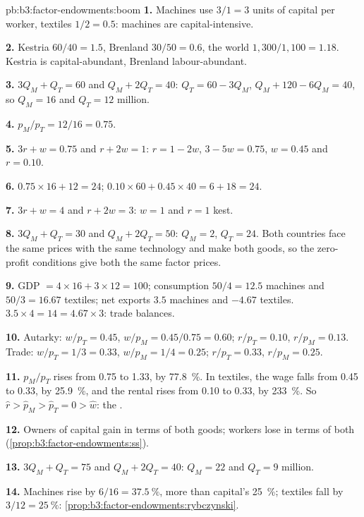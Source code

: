\begin{solution}{pb:b3:factor-endowments:boom}
\textbf{1.} Machines use $3/1 = 3$ units of capital per worker, textiles $1/2 = 0.5$:
machines are capital-intensive. %

\textbf{2.} Kestria $60/40 = 1.5$, Brenland $30/50 = 0.6$, the world $1{,}300/1{,}100 = 1.18$.
Kestria is capital-abundant, Brenland labour-abundant.

\textbf{3.} $3Q_M + Q_T = 60$ and $Q_M + 2Q_T = 40$: $Q_T = 60 - 3Q_M$, $Q_M + 120 - 6Q_M = 40$, so
$Q_M = 16$ and $Q_T = 12$ million. %

\textbf{4.} $p_M/p_T = 12/16 = 0.75$.

\textbf{5.} $3r + w = 0.75$ and $r + 2w = 1$: $r = 1 - 2w$, $3 - 5w = 0.75$, $w = 0.45$ and $r =
0.10$.

\textbf{6.} $0.75 \times 16 + 12 = 24$; $0.10 \times 60 + 0.45 \times 40 = 6 + 18 = 24$.

\textbf{7.} $3r + w = 4$ and $r + 2w = 3$: $w = 1$ and $r = 1$ kest.

\textbf{8.} $3Q_M + Q_T = 30$ and $Q_M + 2Q_T = 50$: $Q_M = 2$, $Q_T = 24$. Both countries
face the same prices with the same technology and make both goods, so the
zero-profit conditions give both the same factor prices.

\textbf{9.} GDP $= 4 \times 16 + 3 \times 12 = 100$; consumption $50/4 = 12.5$ machines and $50/3
= 16.67$ textiles; net exports $3.5$ machines and $-4.67$ textiles. $3.5 \times 4 = 14 =
4.67 \times 3$: trade balances.

\textbf{10.} Autarky: $w/p_T = 0.45$, $w/p_M = 0.45/0.75 = 0.60$; $r/p_T = 0.10$, $r/p_M =
0.13$. Trade: $w/p_T = 1/3 = 0.33$, $w/p_M = 1/4 = 0.25$; $r/p_T = 0.33$, $r/p_M = 0.25$.

\textbf{11.} $p_M/p_T$ rises from 0.75 to 1.33, by 77.8~\%. In textiles, the wage falls
from 0.45 to 0.33, by 25.9~\%, and the rental rises from 0.10 to 0.33, by 233~\%. So
$\hat r > \hat p_M > \hat p_T = 0 > \hat w$: the .

\textbf{12.} Owners of capital gain in terms of both goods; workers lose in terms
of both (\cref{prop:b3:factor-endowments:ss}).

\textbf{13.} $3Q_M + Q_T = 75$ and $Q_M + 2Q_T = 40$: $Q_M = 22$ and $Q_T = 9$ million.

\textbf{14.} Machines rise by $6/16 = 37.5~\%$, more than capital's 25~\%; textiles fall
by $3/12 = 25~\%$: \cref{prop:b3:factor-endowments:rybczynski}.


\end{solution}
